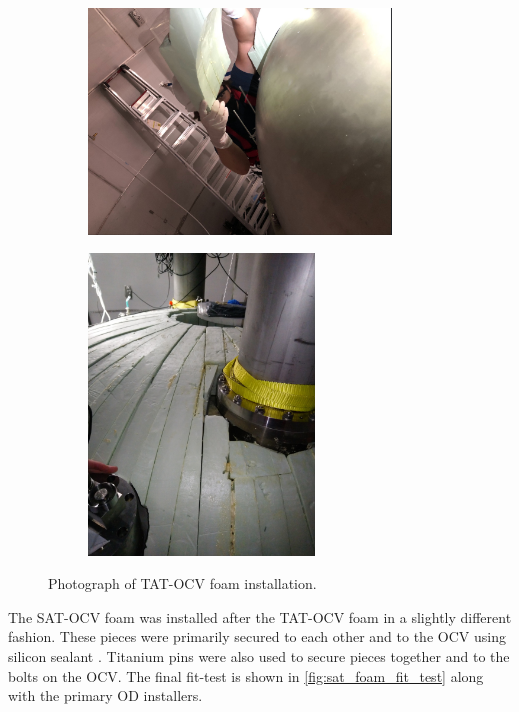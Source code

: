 \begin{figure}[]
\begin{subfigure}{.5\textwidth}
  \centering
  \includegraphics[height=6cm, width=\linewidth]{Figures/Construction/TAT_foam_installation.png}
  \end{subfigure}
  \begin{subfigure}{.5\textwidth}
  \centering
  \includegraphics[height=\linewidth, width=6cm, angle=-90,]{Figures/Construction/TAT_foam_complete.jpg}
  \end{subfigure}
\caption{Photograph of TAT-OCV foam installation.}
\label{fig:TAT_foam_installation}
\end{figure}

\par
The SAT-OCV foam was installed after the TAT-OCV foam in a slightly different fashion.
These pieces were primarily secured to each other and to the OCV using silicon sealant \cite{dowsil_silicone_ref}.
Titanium pins were also used to secure pieces together and to the bolts on the OCV.
The final fit-test is shown in \autoref{fig:sat_foam_fit_test} along with the primary OD installers.


